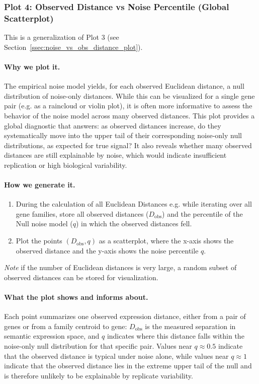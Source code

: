         \subsubsection{Plot 4: Observed Distance vs Noise Percentile (Global Scatterplot)}\label{ssec:obs_vs_noise_quant_plot}

            This is a generalization of Plot 3 (see Section~\ref{ssec:noise_vs_obs_distance_plot}).

            \paragraph{Why we plot it.}
            The empirical noise model yields, for each observed Euclidean distance, a null distribution of noise-only distances. While this can be visualized for a single gene pair (e.g. as a raincloud or violin plot), it is often more informative to assess the behavior of the noise model across many observed distances. This plot provides a global diagnostic that answers: as observed distances increase, do they systematically move into the upper tail of their corresponding noise-only null distributions, as expected for true signal? It also reveals whether many observed distances are still explainable by noise, which would indicate insufficient replication or high biological variability.

            \paragraph{How we generate it.}
            \begin{enumerate}
                \item During the calculation of all Euclidean Distances e.g. while iterating over all gene families, store all observed distances ($D_{\mathrm{obs}}$) and the percentile of the Null noise model ($q$) in which the observed distances fell.
                \item Plot the points $(D_{\mathrm{obs}}, q)$ as a scatterplot, where the x-axis shows the observed distance and the y-axis shows the noise percentile $q$.
            \end{enumerate}

            \emph{Note} if the number of Euclidean distances is very large, a random subset of observed distances can be stored for visualization.

            \paragraph{What the plot shows and informs about.}
            Each point summarizes one observed expression distance, either from a pair of genes or from a family centroid to gene: $D_{\mathrm{obs}}$ is the measured separation in semantic expression space, and $q$ indicates where this distance falls within the noise-only null distribution for that specific pair. Values near $q \approx 0.5$ indicate that the observed distance is typical under noise alone, while values near $q \approx 1$ indicate that the observed distance lies in the extreme upper tail of the null and is therefore unlikely to be explainable by replicate variability.

